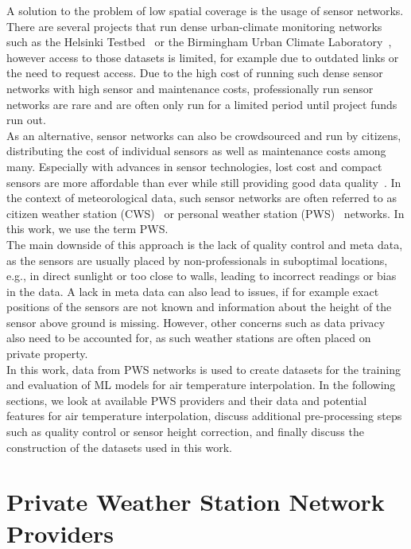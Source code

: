 A solution to the problem of low spatial coverage is the usage of sensor networks. There are several projects that run dense urban-climate monitoring networks~\cite{muller2013sensors} such as the Helsinki Testbed~\cite{koskinen2011helsinki} or the Birmingham Urban Climate Laboratory~\cite{warren2016birmingham}, however access to those datasets is limited, for example due to outdated links or the need to request access. Due to the high cost of running such dense sensor networks with high sensor and maintenance costs, professionally run sensor networks are rare and are often only run for a limited period until project funds run out.\\
As an alternative, sensor networks can also be crowdsourced and run by citizens, distributing the cost of individual sensors as well as maintenance costs among many. Especially with advances in sensor technologies, lost cost and compact sensors are more affordable than ever while still providing good data quality~\cite{grimmond2006progress, rundel2009environmental}. In the context of meteorological data, such sensor networks are often referred to as citizen weather station (CWS)~\cite{meier2017crowdsourcing} or personal weather station (PWS)~\cite{hahn2022observations} networks. In this work, we use the term PWS.\\
The main downside of this approach is the lack of quality control and meta data, as the sensors are usually placed by non-professionals in suboptimal locations, e.g., in direct sunlight or too close to walls, leading to incorrect readings or bias in the data. A lack in meta data can also lead to issues, if for example exact positions of the sensors are not known and information about the height of the sensor above ground is missing. However, other concerns such as data privacy also need to be accounted for, as such weather stations are often placed on private property.\\
In this work, data from PWS networks is used to create datasets for the training and evaluation of ML models for air temperature interpolation. In the following sections, we look at available PWS providers and their data and potential features for air temperature interpolation, discuss additional pre-processing steps such as quality control or sensor height correction, and finally discuss the construction of the datasets used in this work.

\section{Private Weather Station Network Providers}
\label{sec: private weather station network providers}

